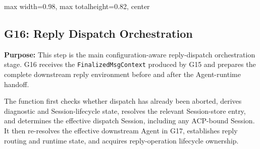 \begin{center}
\begin{adjustbox}{
max width=0.98\textwidth,
max totalheight=0.82\textheight,
center
}

\end{adjustbox}

\end{center}


\subsection*{G16: Reply Dispatch Orchestration}

\textbf{Purpose:}
This step is the main configuration-aware reply-dispatch orchestration
stage. G16 receives the \texttt{FinalizedMsgContext} produced by G15
and prepares the complete downstream reply environment before and
after the Agent-runtime handoff.

The function first checks whether dispatch has already been aborted,
derives diagnostic and Session-lifecycle state, resolves the relevant
Session-store entry, and determines the effective dispatch Session,
including any ACP-bound Session. It then re-resolves the effective
downstream Agent in G17, establishes reply routing and runtime state,
and acquires reply-operation lifecycle ownership.

